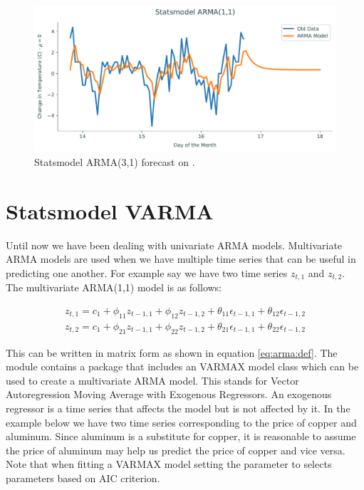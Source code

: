 \begin{figure}[H]
\centering
\includegraphics[width=\textwidth]{figures/sm.pdf}
\caption{Statsmodel ARMA(3,1) forecast on .}
\label{fig:sm}
\end{figure}


\section*{Statsmodel VARMA}
Until now we have been dealing with univariate ARMA models.
Multivariate ARMA models are used when we have multiple time series that can be useful in predicting one another.
For example say we have two time series $z_{t,1}$ and $z_{t,2}$.
The multivariate ARMA(1,1) model is as follows:

\begin{align}
	z_{t,1} = c_1 + \phi_{11} z_{t-1,1} +  \phi_{12} z_{t-1,2} +  \theta_{11} \epsilon_{t-1,1} +  \theta_{12} \epsilon_{t-1,2}
	\\
	z_{t,2} = c_1 + \phi_{21} z_{t-1,1} +  \phi_{22} z_{t-1,2} +  \theta_{21} \epsilon_{t-1,1} +  \theta_{22} \epsilon_{t-1,2}
\end{align}

This can be written in matrix form as shown in equation \ref{eq:arma:def}.
The module  contains a package that includes an VARMAX model class which can be used to create a multivariate ARMA model.
This stands for Vector Autoregression Moving Average with Exogenous Regressors. 
An exogenous regressor is a time series that affects the model but is not affected by it.
In the example below we have two time series corresponding to the price of copper and aluminum. 
Since aluminum is a substitute for copper, it is reasonable to assume the price of aluminum may help us predict the price of copper and vice versa.
Note that when fitting a VARMAX model setting the parameter  to  selects parameters based on AIC criterion. 

